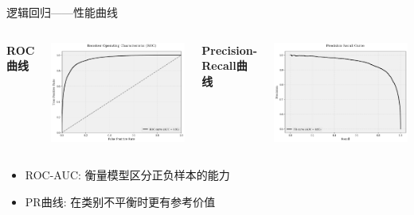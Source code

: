 \documentclass{beamer}
\begin{document}
\begin{frame}{逻辑回归——性能曲线}
    \begin{columns}
        \textbf{ROC曲线}
        \begin{center}
            \includegraphics[width=\textwidth]{pic/LR7.png}
        \end{center}

        \textbf{Precision-Recall曲线}
        \begin{center}
            \includegraphics[width=\textwidth]{pic/LR8.png}
        \end{center}
    \end{columns}

    \begin{itemize}
        \item ROC-AUC: 衡量模型区分正负样本的能力
        \item PR曲线: 在类别不平衡时更有参考价值
    \end{itemize}
\end{frame}
\end{document}
